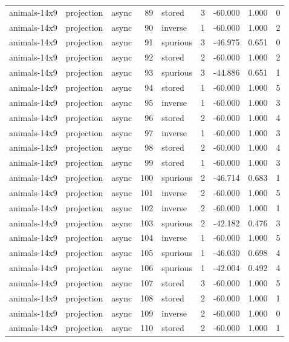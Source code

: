 \begin{tabular}{lllrlrrrr}
animals-14x9 & projection & async & 89 & stored & 3 & -60.000 & 1.000 & 0 \\
animals-14x9 & projection & async & 90 & inverse & 1 & -60.000 & 1.000 & 2 \\
animals-14x9 & projection & async & 91 & spurious & 3 & -46.975 & 0.651 & 0 \\
animals-14x9 & projection & async & 92 & stored & 2 & -60.000 & 1.000 & 2 \\
animals-14x9 & projection & async & 93 & spurious & 3 & -44.886 & 0.651 & 1 \\
animals-14x9 & projection & async & 94 & stored & 1 & -60.000 & 1.000 & 5 \\
animals-14x9 & projection & async & 95 & inverse & 1 & -60.000 & 1.000 & 3 \\
animals-14x9 & projection & async & 96 & stored & 2 & -60.000 & 1.000 & 4 \\
animals-14x9 & projection & async & 97 & inverse & 1 & -60.000 & 1.000 & 3 \\
animals-14x9 & projection & async & 98 & stored & 2 & -60.000 & 1.000 & 4 \\
animals-14x9 & projection & async & 99 & stored & 1 & -60.000 & 1.000 & 3 \\
animals-14x9 & projection & async & 100 & spurious & 2 & -46.714 & 0.683 & 1 \\
animals-14x9 & projection & async & 101 & inverse & 2 & -60.000 & 1.000 & 5 \\
animals-14x9 & projection & async & 102 & inverse & 2 & -60.000 & 1.000 & 1 \\
animals-14x9 & projection & async & 103 & spurious & 2 & -42.182 & 0.476 & 3 \\
animals-14x9 & projection & async & 104 & inverse & 1 & -60.000 & 1.000 & 5 \\
animals-14x9 & projection & async & 105 & spurious & 1 & -46.030 & 0.698 & 4 \\
animals-14x9 & projection & async & 106 & spurious & 1 & -42.004 & 0.492 & 4 \\
animals-14x9 & projection & async & 107 & stored & 3 & -60.000 & 1.000 & 5 \\
animals-14x9 & projection & async & 108 & stored & 2 & -60.000 & 1.000 & 1 \\
animals-14x9 & projection & async & 109 & inverse & 2 & -60.000 & 1.000 & 0 \\
animals-14x9 & projection & async & 110 & stored & 2 & -60.000 & 1.000 & 1 \\

\end{tabular}
